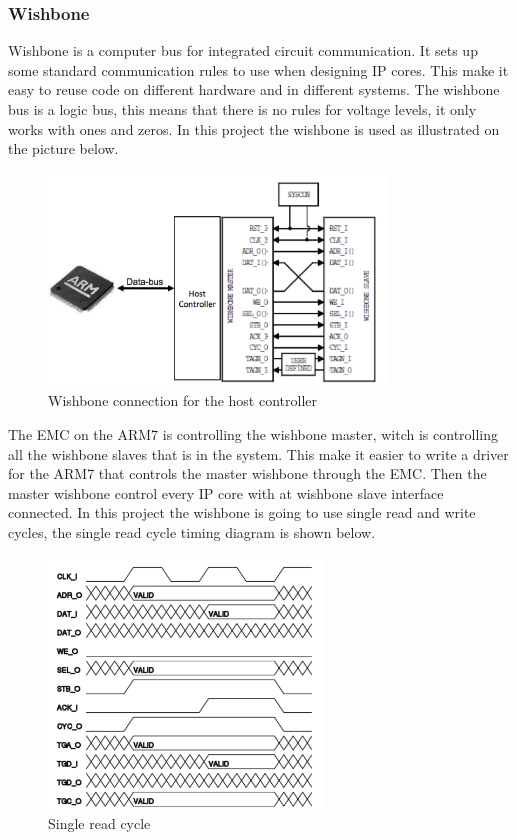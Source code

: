 \subsubsection{Wishbone}

Wishbone is a computer bus for integrated circuit communication. It sets up some standard communication rules to use when designing IP cores. This make it easy to reuse code on different hardware and in different systems. The wishbone bus is a logic bus, this means that there is no rules for voltage levels, it only works with ones and zeros. In this project the wishbone is used as illustrated on the picture below.
\begin{figure}[H]
	\begin{centering}
		 \includegraphics[width=0.8\textwidth]{images/typical_usage.png}
		\caption{Wishbone connection for the host controller}
	\end{centering}
\end{figure}
The EMC on the ARM7 is controlling the wishbone master, witch is controlling all the wishbone slaves that is in the system. This make it easier to write a driver for the ARM7 that controls the master wishbone through the EMC. Then the master wishbone control every IP core with at wishbone slave interface connected. In this project the wishbone is going to use single read and write cycles, the single read cycle timing diagram is shown below.
\begin{figure}[H]
	\begin{centering}
		 \includegraphics[width=0.65\textwidth]{images/wb_single_read.png}
		\caption{Single read cycle}
	\end{centering}
\end{figure}
